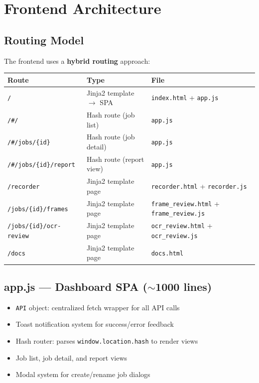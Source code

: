 \documentclass[12pt, a4paper]{article}
\newcommand{\codeinline}[1]{\texttt{\small\colorbox{codebg}{#1}}}
\newcommand{\filepath}[1]{\texttt{\small #1}}
\begin{document}
\section{Frontend Architecture}

\subsection{Routing Model}

The frontend uses a \textbf{hybrid routing} approach:

\begin{tabularx}{\textwidth}{@{} l l X @{}}
    \toprule
    \textbf{Route} & \textbf{Type} & \textbf{File} \\
    \midrule
    \codeinline{/} & Jinja2 template $\rightarrow$ SPA & \filepath{index.html} + \filepath{app.js} \\
    \codeinline{/\#/} & Hash route (job list) & \filepath{app.js} \\
    \codeinline{/\#/jobs/\{id\}} & Hash route (job detail) & \filepath{app.js} \\
    \codeinline{/\#/jobs/\{id\}/report} & Hash route (report view) & \filepath{app.js} \\
    \codeinline{/recorder} & Jinja2 template page & \filepath{recorder.html} + \filepath{recorder.js} \\
    \codeinline{/jobs/\{id\}/frames} & Jinja2 template page & \filepath{frame\_review.html} + \filepath{frame\_review.js} \\
    \codeinline{/jobs/\{id\}/ocr-review} & Jinja2 template page & \filepath{ocr\_review.html} + \filepath{ocr\_review.js} \\
    \codeinline{/docs} & Jinja2 template page & \filepath{docs.html} \\
    \bottomrule
\end{tabularx}

\subsection{app.js --- Dashboard SPA ($\sim$1000 lines)}

\begin{itemize}
    \item \codeinline{API} object: centralized fetch wrapper for all API calls
    \item Toast notification system for success/error feedback
    \item Hash router: parses \codeinline{window.location.hash} to render views
    \item Job list, job detail, and report views
    \item Modal system for create/rename job dialogs
\end{itemize}
\end{document}

